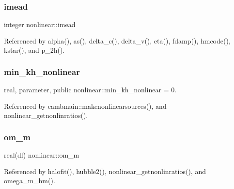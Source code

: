 \mbox{\label{namespacenonlinear_a4a5afbc21c01819b53e73cca3ae9c9db}} 
\subsubsection{\texorpdfstring{imead}{imead}}
{\footnotesize\ttfamily integer nonlinear\+::imead\hspace{0.3cm}{\ttfamily [private]}}



Referenced by alpha(), as(), delta\+\_\+c(), delta\+\_\+v(), eta(), fdamp(), hmcode(), kstar(), and p\+\_\+2h().

\mbox{\label{namespacenonlinear_a432119e2fd5a90bc8447a4f87c530660}} 
\subsubsection{\texorpdfstring{min\+\_\+kh\+\_\+nonlinear}{min\_kh\_nonlinear}}
{\footnotesize\ttfamily real, parameter, public nonlinear\+::min\+\_\+kh\+\_\+nonlinear = 0.}



Referenced by cambmain\+::makenonlinearsources(), and nonlinear\+\_\+getnonlinratios().

\mbox{\label{namespacenonlinear_aabc1c1c2e5484d59aa19897c2312d66e}} 
\subsubsection{\texorpdfstring{om\+\_\+m}{om\_m}}
{\footnotesize\ttfamily real(dl) nonlinear\+::om\+\_\+m\hspace{0.3cm}{\ttfamily [private]}}



Referenced by halofit(), hubble2(), nonlinear\+\_\+getnonlinratios(), and omega\+\_\+m\+\_\+hm().

\mbox{\label{namespacenonlinear_a5fffe9648c0924743701abc9674d3472}} 
